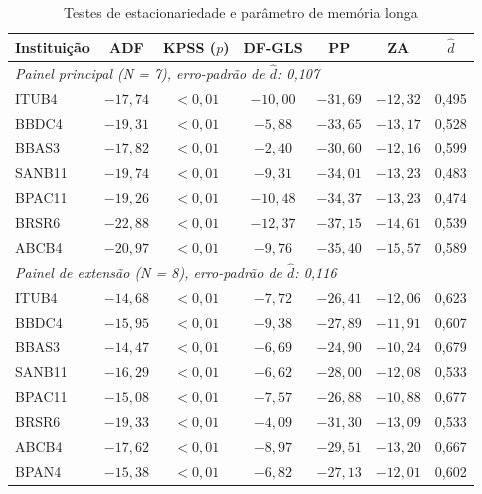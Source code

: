 \begin{table}[!htbp]
\centering
\caption{Testes de estacionariedade e parâmetro de memória longa}
\label{tab:testes}
\small
\begin{tabular}{lcccccc}
\toprule
Instituição & ADF & KPSS ($p$) & DF-GLS & PP & ZA & $\hat{d}$ \\
\midrule
\multicolumn{7}{l}{\textit{Painel principal (N = 7), erro-padrão de $\hat{d}$: 0,107}} \\
ITUB4  & $-17{,}74$ & $<0{,}01$ & $-10{,}00$ & $-31{,}69$ & $-12{,}32$ & 0,495 \\
BBDC4  & $-19{,}31$ & $<0{,}01$ &  $-5{,}88$ & $-33{,}65$ & $-13{,}17$ & 0,528 \\
BBAS3  & $-17{,}82$ & $<0{,}01$ &  $-2{,}40$ & $-30{,}60$ & $-12{,}16$ & 0,599 \\
SANB11 & $-19{,}74$ & $<0{,}01$ &  $-9{,}31$ & $-34{,}01$ & $-13{,}23$ & 0,483 \\
BPAC11 & $-19{,}26$ & $<0{,}01$ & $-10{,}48$ & $-34{,}37$ & $-13{,}23$ & 0,474 \\
BRSR6  & $-22{,}88$ & $<0{,}01$ & $-12{,}37$ & $-37{,}15$ & $-14{,}61$ & 0,539 \\
ABCB4  & $-20{,}97$ & $<0{,}01$ &  $-9{,}76$ & $-35{,}40$ & $-15{,}57$ & 0,589 \\
\midrule
\multicolumn{7}{l}{\textit{Painel de extensão (N = 8), erro-padrão de $\hat{d}$: 0,116}} \\
ITUB4  & $-14{,}68$ & $<0{,}01$ &  $-7{,}72$ & $-26{,}41$ & $-12{,}06$ & 0,623 \\
BBDC4  & $-15{,}95$ & $<0{,}01$ &  $-9{,}38$ & $-27{,}89$ & $-11{,}91$ & 0,607 \\
BBAS3  & $-14{,}47$ & $<0{,}01$ &  $-6{,}69$ & $-24{,}90$ & $-10{,}24$ & 0,679 \\
SANB11 & $-16{,}29$ & $<0{,}01$ &  $-6{,}62$ & $-28{,}00$ & $-12{,}08$ & 0,533 \\
BPAC11 & $-15{,}08$ & $<0{,}01$ &  $-7{,}57$ & $-26{,}88$ & $-10{,}88$ & 0,677 \\
BRSR6  & $-19{,}33$ & $<0{,}01$ &  $-4{,}09$ & $-31{,}30$ & $-13{,}09$ & 0,533 \\
ABCB4  & $-17{,}62$ & $<0{,}01$ &  $-8{,}97$ & $-29{,}51$ & $-13{,}20$ & 0,667 \\
BPAN4  & $-15{,}38$ & $<0{,}01$ &  $-6{,}82$ & $-27{,}13$ & $-12{,}01$ & 0,602 \\
\bottomrule
\end{tabular}
\end{table}

